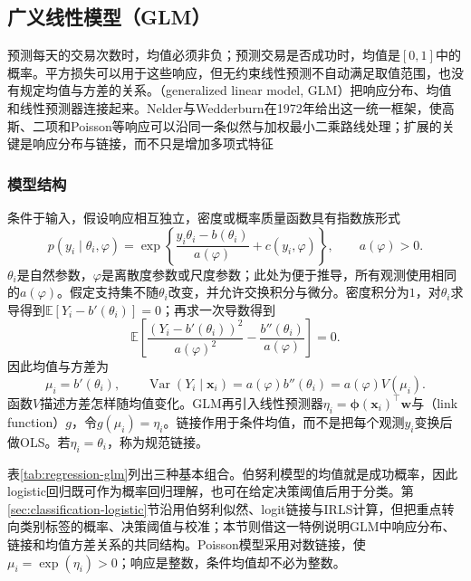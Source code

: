 \subsection{广义线性模型（GLM）}
\label{sec:regression-glm}

预测每天的交易次数时，均值必须非负；预测交易是否成功时，均值是$[0,1]$中的概率。平方损失可以用于这些响应，但无约束线性预测不自动满足取值范围，也没有规定均值与方差的关系。（generalized linear model, GLM）把响应分布、均值和线性预测器连接起来。Nelder与Wedderburn在1972年给出这一统一框架，使高斯、二项和Poisson等响应可以沿同一条似然与加权最小二乘路线处理；扩展的关键是响应分布与链接，而不只是增加多项式特征

\subsubsection{模型结构}

条件于输入，假设响应相互独立，密度或概率质量函数具有指数族形式
\begin{equation}
  p(y_i\mid\theta_i,\varphi)
  =\exp\!\left\{
    \frac{y_i\theta_i-b(\theta_i)}{a(\varphi)}
    +c(y_i,\varphi)\right\},\qquad a(\varphi)>0.
  \label{eq:regression-exponential-family}
\end{equation}
$\theta_i$是自然参数，$\varphi$是离散度参数或尺度参数；此处为便于推导，所有观测使用相同的$a(\varphi)$。假定支持集不随$\theta_i$改变，并允许交换积分与微分。密度积分为$1$，对$\theta_i$求导得到$\mathbb{E}[Y_i-b'(\theta_i)]=0$；再求一次导数得到
\[
  \mathbb{E}\!\left[
    \frac{(Y_i-b'(\theta_i))^2}{a(\varphi)^2}
      -\frac{b''(\theta_i)}{a(\varphi)}\right]=0.
\]
因此均值与方差为
\begin{equation}
  \mu_i=b'(\theta_i),\qquad
  \operatorname{Var}(Y_i\mid\bm{x}_i)
  =a(\varphi)b''(\theta_i)=a(\varphi)V(\mu_i).
  \label{eq:regression-glm-moments}
\end{equation}
函数$V$描述方差怎样随均值变化。GLM再引入线性预测器$\eta_i=\bm{\phi}(\bm{x}_i)^{\top}\bm{w}$与（link function）$g$，令$g(\mu_i)=\eta_i$。链接作用于条件均值，而不是把每个观测$y_i$变换后做OLS。若$\eta_i=\theta_i$，称为规范链接。

表\ref{tab:regression-glm}列出三种基本组合。伯努利模型的均值就是成功概率，因此logistic回归既可作为概率回归理解，也可在给定决策阈值后用于分类。第\ref{sec:classification-logistic}节沿用伯努利似然、logit链接与IRLS计算，但把重点转向类别标签的概率、决策阈值与校准；本节则借这一特例说明GLM中响应分布、链接和均值方差关系的共同结构。Poisson模型采用对数链接，使$\mu_i=\exp(\eta_i)>0$；响应是整数，条件均值却不必为整数。


